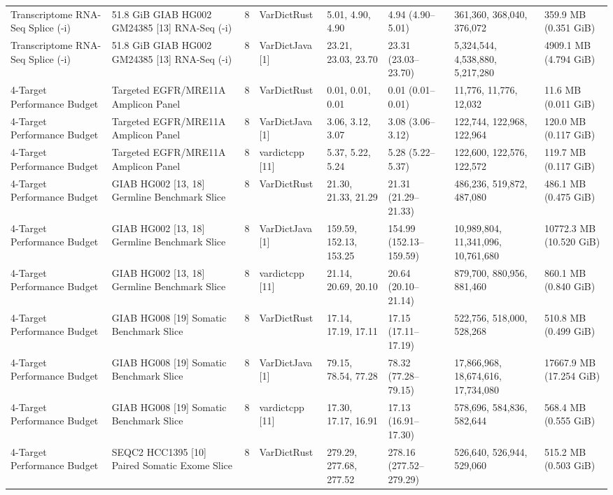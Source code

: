 \begin{table}[htbp]
{\begin{tabular}{llllllll}
Transcriptome RNA-Seq Splice (-i) & 51.8 GiB GIAB HG002 GM24385 [13] RNA-Seq (-i) & 8 & VarDictRust & 5.01, 4.90, 4.90 & 4.94 (4.90--5.01) & 361,360, 368,040, 376,072 & 359.9 MB (0.351 GiB) \\
Transcriptome RNA-Seq Splice (-i) & 51.8 GiB GIAB HG002 GM24385 [13] RNA-Seq (-i) & 8 & VarDictJava [1] & 23.21, 23.03, 23.70 & 23.31 (23.03--23.70) & 5,324,544, 4,538,880, 5,217,280 & 4909.1 MB (4.794 GiB) \\
4-Target Performance Budget & Targeted EGFR/MRE11A Amplicon Panel & 8 & VarDictRust & 0.01, 0.01, 0.01 & 0.01 (0.01--0.01) & 11,776, 11,776, 12,032 & 11.6 MB (0.011 GiB) \\
4-Target Performance Budget & Targeted EGFR/MRE11A Amplicon Panel & 8 & VarDictJava [1] & 3.06, 3.12, 3.07 & 3.08 (3.06--3.12) & 122,744, 122,968, 122,964 & 120.0 MB (0.117 GiB) \\
4-Target Performance Budget & Targeted EGFR/MRE11A Amplicon Panel & 8 & vardictcpp [11] & 5.37, 5.22, 5.24 & 5.28 (5.22--5.37) & 122,600, 122,576, 122,572 & 119.7 MB (0.117 GiB) \\
4-Target Performance Budget & GIAB HG002 [13, 18] Germline Benchmark Slice & 8 & VarDictRust & 21.30, 21.33, 21.29 & 21.31 (21.29--21.33) & 486,236, 519,872, 487,080 & 486.1 MB (0.475 GiB) \\
4-Target Performance Budget & GIAB HG002 [13, 18] Germline Benchmark Slice & 8 & VarDictJava [1] & 159.59, 152.13, 153.25 & 154.99 (152.13--159.59) & 10,989,804, 11,341,096, 10,761,680 & 10772.3 MB (10.520 GiB) \\
4-Target Performance Budget & GIAB HG002 [13, 18] Germline Benchmark Slice & 8 & vardictcpp [11] & 21.14, 20.69, 20.10 & 20.64 (20.10--21.14) & 879,700, 880,956, 881,460 & 860.1 MB (0.840 GiB) \\
4-Target Performance Budget & GIAB HG008 [19] Somatic Benchmark Slice & 8 & VarDictRust & 17.14, 17.19, 17.11 & 17.15 (17.11--17.19) & 522,756, 518,000, 528,268 & 510.8 MB (0.499 GiB) \\
4-Target Performance Budget & GIAB HG008 [19] Somatic Benchmark Slice & 8 & VarDictJava [1] & 79.15, 78.54, 77.28 & 78.32 (77.28--79.15) & 17,866,968, 18,674,616, 17,734,080 & 17667.9 MB (17.254 GiB) \\
4-Target Performance Budget & GIAB HG008 [19] Somatic Benchmark Slice & 8 & vardictcpp [11] & 17.30, 17.17, 16.91 & 17.13 (16.91--17.30) & 578,696, 584,836, 582,644 & 568.4 MB (0.555 GiB) \\
4-Target Performance Budget & SEQC2 HCC1395 [10] Paired Somatic Exome Slice & 8 & VarDictRust & 279.29, 277.68, 277.52 & 278.16 (277.52--279.29) & 526,640, 526,944, 529,060 & 515.2 MB (0.503 GiB) \\

\end{tabular}}
\end{table}
